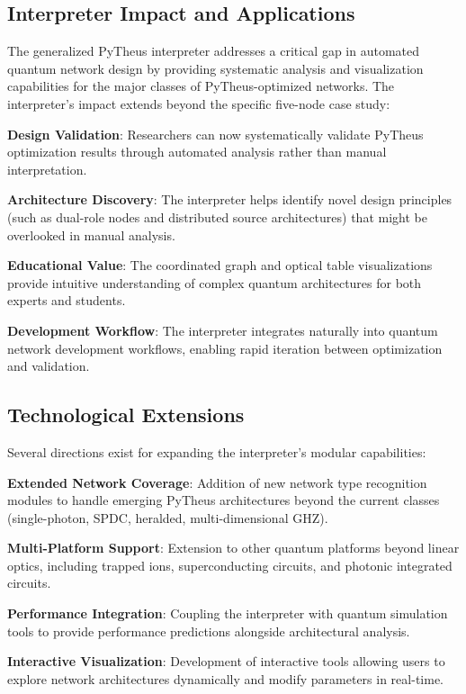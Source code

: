 \documentclass[11pt,a4paper]{article}
\begin{document}
\subsection{Interpreter Impact and Applications}

The generalized PyTheus interpreter addresses a critical gap in automated quantum network design by providing systematic analysis and visualization capabilities for the major classes of PyTheus-optimized networks. The interpreter's impact extends beyond the specific five-node case study:

\textbf{Design Validation}: Researchers can now systematically validate PyTheus optimization results through automated analysis rather than manual interpretation.

\textbf{Architecture Discovery}: The interpreter helps identify novel design principles (such as dual-role nodes and distributed source architectures) that might be overlooked in manual analysis.

\textbf{Educational Value}: The coordinated graph and optical table visualizations provide intuitive understanding of complex quantum architectures for both experts and students.

\textbf{Development Workflow}: The interpreter integrates naturally into quantum network development workflows, enabling rapid iteration between optimization and validation.

\subsection{Technological Extensions}

Several directions exist for expanding the interpreter's modular capabilities:

\textbf{Extended Network Coverage}: Addition of new network type recognition modules to handle emerging PyTheus architectures beyond the current classes (single-photon, SPDC, heralded, multi-dimensional GHZ).

\textbf{Multi-Platform Support}: Extension to other quantum platforms beyond linear optics, including trapped ions, superconducting circuits, and photonic integrated circuits.

\textbf{Performance Integration}: Coupling the interpreter with quantum simulation tools to provide performance predictions alongside architectural analysis.

\textbf{Interactive Visualization}: Development of interactive tools allowing users to explore network architectures dynamically and modify parameters in real-time.
\end{document}
